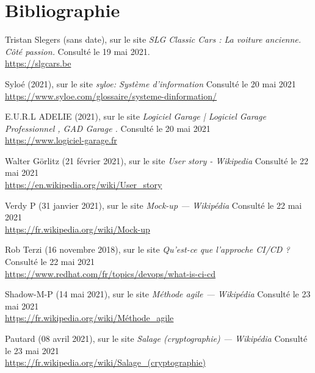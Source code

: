 \section{Bibliographie}

\renewcommand{\section}[2]{}%
\begin{thebibliography}{}

Tristan Slegers (sans date), sur le site \textit{SLG Classic Cars : La voiture ancienne. Côté passion.} Consulté le 19 mai 2021.
\\\url{https://slgcars.be}

Syloé (2021), sur le site \textit{syloe: Système d'information} Consulté le 20 mai 2021
\\\url{https://www.syloe.com/glossaire/systeme-dinformation/}

E.U.R.L ADELIE (2021), sur le site \textit{Logiciel Garage | Logiciel Garage Professionnel , GAD Garage .} Consulté le 20 mai 2021
\\\url{https://www.logiciel-garage.fr}

Walter Görlitz (21 février 2021), sur le site \textit{User story - Wikipedia} Consulté le 22 mai 2021
\\\url{https://en.wikipedia.org/wiki/User_story}

Verdy P (31 janvier 2021), sur le site \textit{Mock-up — Wikipédia} Consulté le 22 mai 2021
\\\url{https://fr.wikipedia.org/wiki/Mock-up}

Rob Terzi (16 novembre 2018), sur le site \textit{Qu'est-ce que l'approche CI/CD ?} Consulté le 22 mai 2021
\\\url{https://www.redhat.com/fr/topics/devops/what-is-ci-cd}

Shadow-M-P (14 mai 2021), sur le site \textit{Méthode agile — Wikipédia} Consulté le 23 mai 2021
\\\url{https://fr.wikipedia.org/wiki/Méthode_agile}

Pautard (08 avril 2021), sur le site \textit{Salage (cryptographie) — Wikipédia} Consulté le 23 mai 2021
\\\url{https://fr.wikipedia.org/wiki/Salage_(cryptographie)}

\end{thebibliography}


